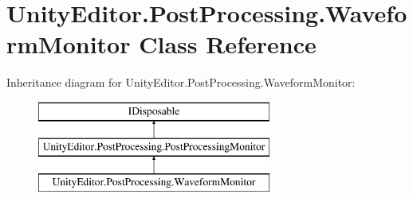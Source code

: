 \hypertarget{class_unity_editor_1_1_post_processing_1_1_waveform_monitor}{}\section{Unity\+Editor.\+Post\+Processing.\+Waveform\+Monitor Class Reference}
\label{class_unity_editor_1_1_post_processing_1_1_waveform_monitor}
Inheritance diagram for Unity\+Editor.\+Post\+Processing.\+Waveform\+Monitor\+:\begin{figure}[H]
\begin{center}
\leavevmode
\includegraphics[height=3.000000cm]{class_unity_editor_1_1_post_processing_1_1_waveform_monitor}
\end{center}
\end{figure}
